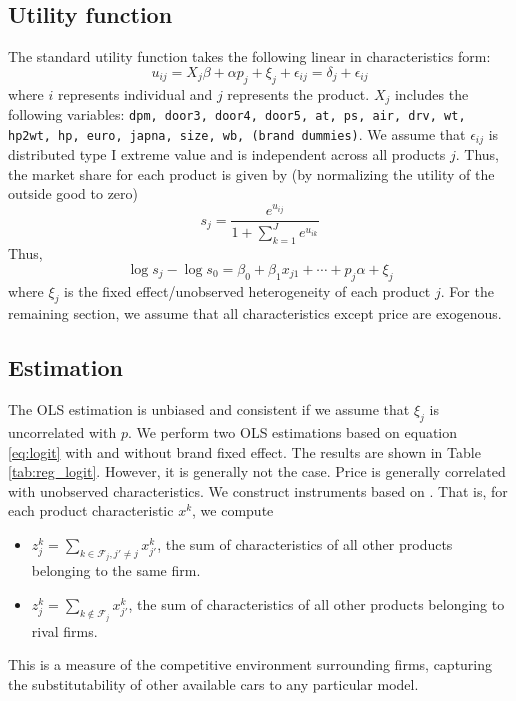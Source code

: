 \documentclass[12pt]{article}[margin=1in]
\begin{document}
\subsection{Utility function}
The standard utility function takes the following linear in characteristics
form:
\begin{equation}
    u_{ij}=X_{j}\beta + \alpha p_{j} + \xi_{j}+ \epsilon_{ij}=\delta_j+\epsilon_{ij}
\end{equation}
where $i$ represents individual and $j$ represents the product. $X_{j}$ includes the following variables: \verb|dpm, door3, door4, door5, at, ps, air, drv, wt, hp2wt, hp, euro, japna, size, wb, (brand dummies)|. We assume that $\epsilon_{ij}$ is distributed type I extreme value and is independent across all products $j$. Thus, the market share for each product is given by (by normalizing the utility of the outside good to zero)
\begin{equation*}
    s_j = \frac{e^{u_{ij}}}{1 + \sum_{k=1}^{J} e^{u_{ik}}}
\end{equation*}
Thus,
\begin{equation}\label{eq:logit}
    \log s_j - \log s_0 = \beta_0 + \beta_1 x_{j1} + \cdots + p_j \alpha + \xi_j
\end{equation}
where $\xi_j$ is the fixed effect/unobserved heterogeneity of each product $j$. For the remaining section, we assume that all characteristics except price are exogenous.

\subsection{Estimation}
The OLS estimation is unbiased and consistent if we assume that $\xi_j$ is
uncorrelated with $p$. We perform two OLS estimations based on equation
\eqref{eq:logit} with and without brand fixed effect. The results are shown in
Table \ref{tab:reg_logit}. However, it is generally not the case. Price is
generally correlated with unobserved characteristics. We construct instruments
based on \citet{berrylevinsohnpakes1995}. That is, for each product
characteristic $x^k$, we compute
\begin{itemize}
    \item $z^k_{j}=\sum_{k\in \mathcal{F}_j, j'\neq j}x^k_{j'}$, the sum of characteristics of all other products belonging to the same firm.
    \item $z^k_{j}=\sum_{k\notin \mathcal{F}_j}x^k_{j'}$, the sum of characteristics of all other products belonging to rival firms.
\end{itemize}
This is a measure of the competitive environment surrounding firms, capturing the substitutability of other available cars to any particular model.
\end{document}
